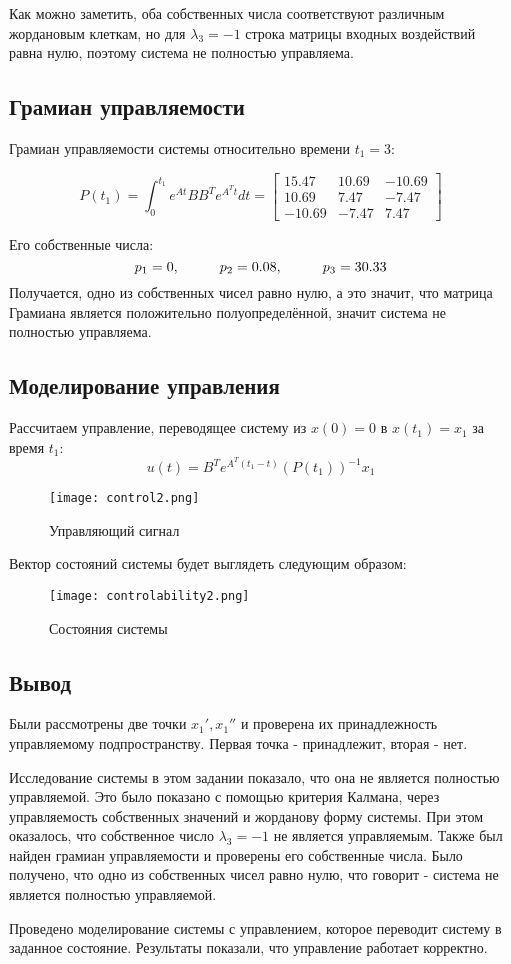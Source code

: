 Как можно заметить, оба собственных числа соответствуют различным жордановым клеткам, 
но для $\lambda_3=-1$ строка матрицы входных воздействий равна нулю, поэтому система не полностью управляема.

\subsection{Грамиан управляемости}

Грамиан управляемости системы относительно времени $t_1 = 3$:

$$
P(t_1) = \int_{0}^{t_1}e^{At}BB^Te^{A^Tt}dt = 
    \begin{bmatrix}
        15.47 & 10.69 & -10.69 \\
        10.69 & 7.47 & -7.47 \\
        -10.69 & -7.47 & 7.47
    \end{bmatrix}
$$

Его собственные числа:
$$
    p_{1} = 0 , \hspace*{1cm} p_{2} = 0.08, \hspace*{1cm} p_3 = 30.33
$$
Получается, одно из собственных чисел равно нулю, а это значит, что матрица Грамиана является положительно полуопределённой, 
значит система не полностью управляема.

\newpage
\subsection{Моделирование управления}

Рассчитаем управление, переводящее систему из $x(0) = 0$ в $x(t_1) = x_1$ за время $t_1$:
$$
    u(t) = B^T e^{A^T(t_1 - t)}(P(t_1))^{-1}x_1 
$$
\begin{figure}[ht]
    \centering
    \texttt{[image: control2.png]}
    \caption{Управляющий сигнал}
\end{figure}

Вектор состояний системы будет выглядеть следующим образом:
\begin{figure}[ht]
  \centering
  \texttt{[image: controlability2.png]}
  \caption{Состояния системы}
\end{figure}

\newpage
\subsection{Вывод}
Были рассмотрены две точки $x_1', x_1''$ и проверена их принадлежность управляемому
подпространству. Первая точка - принадлежит, вторая - нет.

Исследование системы в этом задании показало, что она не является полностью управляемой. 
Это было показано с помощью критерия Калмана, через управляемость собственных значений и жорданову форму системы.
При этом оказалось, что собственное число $\lambda_3=-1$ не является управляемым. 
Также был найден грамиан управляемости и проверены его собственные числа. 
Было получено, что одно из собственных чисел равно нулю, что говорит - система не является полностью управляемой.

Проведено моделирование системы с управлением, которое переводит систему в заданное состояние. 
Результаты показали, что  управление работает корректно.
\endinput